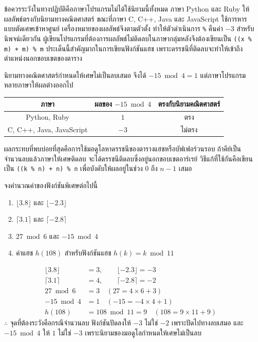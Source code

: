 ข้อควรระวังในทางปฏิบัติคือภาษาโปรแกรมไม่ได้ใช้นิยามนี้ทั้งหมด ภาษา Python และ Ruby ให้ผลลัพธ์ตรงกับนิยามทางคณิตศาสตร์ ขณะที่ภาษา C, C++, Java และ JavaScript ใช้การหารแบบตัดเศษเข้าหาศูนย์ เครื่องหมายของผลลัพธ์จึงตามตัวตั้ง ทำให้ตัวดำเนินการ \texttt{\%} คืนค่า $-3$ สำหรับนิพจน์เดียวกัน ผู้เขียนโปรแกรมที่ต้องการผลลัพธ์ไม่ติดลบในภาษากลุ่มหลังจึงต้องเขียนเป็น \texttt{((x \% m) + m) \% m} ประเด็นนี้สำคัญมากในการเขียนฟังก์ชันแฮช เพราะดรรชนีที่ติดลบจะทำให้เข้าถึงตำแหน่งนอกขอบเขตของตาราง

\begin{warning}
นิยามทางคณิตศาสตร์กำหนดให้เศษไม่เป็นลบเสมอ จึงได้ $-15 \bmod 4 = 1$ แต่ภาษาโปรแกรมหลายภาษาให้ผลต่างออกไป

\begin{center}
\begin{tabular}{|c|c|c|}
\hline
\textbf{ภาษา} & \textbf{ผลของ} $-15 \bmod 4$ & \textbf{ตรงกับนิยามคณิตศาสตร์} \\
\hline
Python, Ruby & $1$ & ตรง \\
\hline
C, C++, Java, JavaScript & $-3$ & ไม่ตรง \\
\hline
\end{tabular}
\end{center}

ผลกระทบที่พบบ่อยที่สุดคือการใช้มอดูโลหาดรรชนีของตารางแฮชหรือบัฟเฟอร์วนรอบ ถ้าคีย์เป็นจำนวนลบแล้วภาษาให้เศษติดลบ จะได้ดรรชนีติดลบซึ่งอยู่นอกขอบเขตอาร์เรย์ วิธีแก้ที่ใช้กันคือเขียนเป็น \texttt{((k \% n) + n) \% n} เพื่อบังคับให้ผลอยู่ในช่วง $0$ ถึง $n-1$ เสมอ
\end{warning}

\begin{ex}
\label{ex:special-functions-calc}
จงคำนวณค่าของฟังก์ชันพิเศษต่อไปนี้
\begin{enumerate}[label=\textbf{\arabic*.}]
    \item $\lfloor 3.8 \rfloor$ และ $\lfloor -2.3 \rfloor$
    \item $\lceil 3.1 \rceil$ และ $\lceil -2.8 \rceil$
    \item $27 \bmod 6$ และ $-15 \bmod 4$
    \item ค่าแฮช $h(108)$ สำหรับฟังก์ชันแฮช $h(k) = k \bmod 11$
\end{enumerate}
\end{ex}
\begin{solution}
\begin{align*}
\lfloor 3.8 \rfloor &= 3, \qquad \lfloor -2.3 \rfloor = -3\\
\lceil 3.1 \rceil &= 4, \qquad \lceil -2.8 \rceil = -2\\
27 \bmod 6 &= 3 \quad (27 = 4 \times 6 + 3)\\
-15 \bmod 4 &= 1 \quad (-15 = -4 \times 4 + 1)\\
h(108) &= 108 \bmod 11 = 9 \quad (108 = 9 \times 11 + 9)
\end{align*}
$\therefore$ จุดที่ต้องระวังคือกรณีจำนวนลบ ฟังก์ชันปัดลงให้ $-3$ ไม่ใช่ $-2$ เพราะปัดไปทางลบเสมอ และ $-15 \bmod 4$ ให้ $1$ ไม่ใช่ $-3$ เพราะนิยามของมอดูโลกำหนดให้เศษไม่เป็นลบ \solhere
\end{solution}

